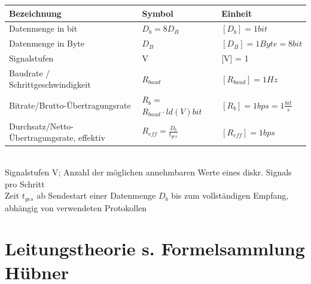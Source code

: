 \documentclass[fs, footer]{latex4ei}
\begin{document}
\begin{multicols*}{4}
{\begin{tabular*}{\columnwidth}{p{1.8cm} | p{1.6cm} | p{2.5cm}}
	Bezeichnung & Symbol & Einheit \\ \hline
	Datenmenge in bit & $D_b = 8 D_B $ & $[D_b] = 1 bit$   \\ \hline
	Datenmenge in Byte & $D_B$ & $[D_B] = 1 Byte = 8 bit  $  \\ \hline
	Signalstufen & V & [V] = 1   \\ \hline
	Baudrate / Schrittgeschwindigkeit & $R_{baud}$ & $[R_{baud}] = 1 Hz $   \\ \hline
	Bitrate/Brutto-Übertragungsrate & $R_b = $$ R_{baud} \cdot ld(V) bit $ & $[R_b] = 1 bps = 1 \frac{bit}{s} $  \\ \hline
	Durchsatz/Netto-Übertragungsrate, effektiv & $R_{eff} = \frac{D_b}{t_{ges}}$ & $[R_{eff}] = 1 bps $ \\
	
	
\end{tabular*}\\

	Signalstufen V; Anzahl der möglichen annehmbaren Werte eines diskr. Signals pro Schritt \\
	Zeit $t_{ges}$ ab Sendestart einer Datenmenge $D_b$ bis zum vollständigen Empfang, abhängig von verwendeten Protokollen \\
	
		
}


\section{Leitungstheorie s. Formelsammlung Hübner}

\end{multicols*}
\end{document}
